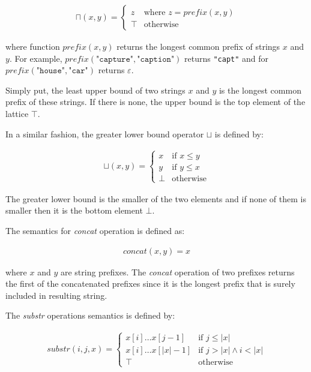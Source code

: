 \documentclass[12pt,final,oneside]{fithesis2}
\theoremstyle{definition}
\begin{document}
\begin{align*}
\sqcap (x, y) =
\begin{cases}
z & \text{where } z
  = \textit{prefix}(x, y) \\
\top       & \text{otherwise}
\end{cases}
\end{align*}

where function $\textit{prefix}(x, y)$ returns the
longest common prefix of strings $x$ and $y$. For
example, $\textit{prefix}(\texttt{"capture"}, \texttt{"caption"})$ returns
\texttt{"capt"} and for $\textit{prefix}(\texttt{"house"}, \texttt{"car"})$
returns $\varepsilon$.

Simply put, the least upper bound of two strings $x$ and $y$
is the longest common prefix of these strings. If there is
none, the upper bound is the top element of the lattice $\top$.

In a similar fashion, the greater lower bound operator $\sqcup$ is defined
by:

\begin{align*}
\sqcup (x, y) =
\begin{cases}
x    & \text{if } x \leq y \\
y    & \text{if } y \leq x \\
\bot & \text{otherwise}
\end{cases}
\end{align*}

The greater lower bound is the smaller of the two elements and if none
of them is smaller then it is the bottom element $\bot$.

The semantics for \textit{concat} operation is defined as:

\begin{align*}
\textit{concat}(x, y) = x
\end{align*}

where $x$ and $y$ are string prefixes. The \textit{concat} operation of two
prefixes returns the first of the concatenated prefixes since it is the
longest prefix that is surely included in resulting string.

The \textit{substr} operations semantics is defined by:

\begin{align*}
\textit{substr}(i, j, x) =
\begin{cases}
x[i] \dots x[j - 1]   & \text{if } j \leq |x| \\
x[i] \dots x[|x| - 1] & \text{if } j > |x| \land i < |x| \\
\top                  & \text{otherwise}
\end{cases}
\end{align*}
\end{document}
